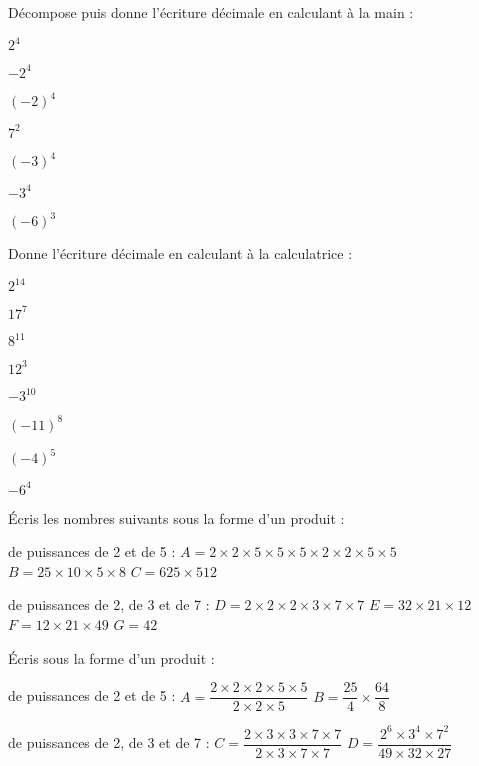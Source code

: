 \begin{exercice}[]
Décompose puis donne l'écriture décimale en calculant à la main :

\begin{colenumerate}{4} 
\item $2^4$
\item $-2^4$
\item $(-2)^4$
\item $7^2$  
\item $(-3)^4$
\item $-3^4$
\item $(-6)^3$
\end{colenumerate} 
 
\end{exercice}

\begin{exercice}[]
Donne l'écriture décimale en calculant à la calculatrice :

\begin{colenumerate}{4} 
\item $2^{14}$ 
\item $17^{7}$ 
\item $8^{11}$
\item $12^3$
\item $-3^{10}$
\item $(-11)^8$
\item $(-4)^5$
\item $-6^4$
\end{colenumerate} 
 
\end{exercice}

\begin{exercice}[]
Écris les nombres suivants sous la forme d'un produit :

\begin{colenumerate}{1} 
\item de puissances de 2 et de 5 :
    \subitem $A = 2 \times 2 \times 5 \times 5 \times 5 \times 2 \times 2 \times 5 \times 5$
    \subitem $B = 25 \times 10 \times 5 \times 8$
    \subitem $C = 625 \times 512$
\item de puissances de 2, de 3 et de 7 :
    \subitem $D = 2 \times 2 \times 2 \times 3 \times 7 \times 7$ 
    \subitem $E = 32 \times 21 \times 12$ 
    \subitem $F = 12 \times 21 \times 49$
    \subitem $G = 42$
\end{colenumerate} 
\end{exercice}

\begin{exercice}[]
Écris sous la forme d'un produit :

\begin{colenumerate}{1} 
\item de puissances de 2 et de 5 :
    \subitem $A =\dfrac{2\times 2\times 2\times 5 \times 5}{2\times 2 \times 5}$ 
    \subitem $B =\dfrac{25}{4} \times \dfrac{64}{8}$ 
\item de puissances de 2, de 3 et de 7 :
    \subitem $C =\dfrac{2\times 3\times 3\times 7 \times 7}{2\times 3 \times 7 \times 7}$ 
    \subitem $D =\dfrac{2^6\times 3^4\times 7^2}{49\times 32 \times 27}$ 
\end{colenumerate} 
\end{exercice}


